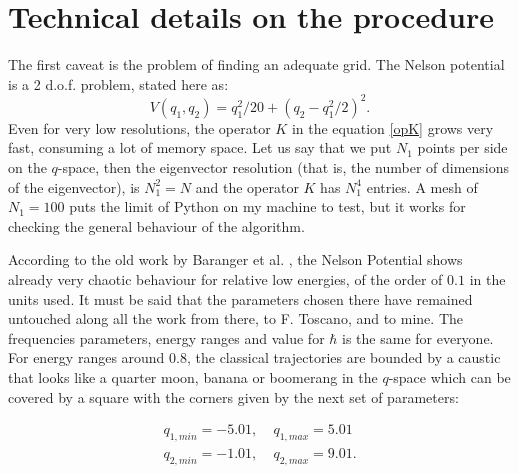 \documentclass[a4paper,12pt]{article}
\begin{document}
\section{Technical details on the procedure}

The first caveat is the problem of finding an adequate grid.
The Nelson potential is a 2 d.o.f. problem, stated here as:
\begin{equation}
V(q_1, q_2)=q_1^2/20+(q_2-q_1^2/2)^2.
\end{equation}
Even for 
very low resolutions, the operator $K$ in the equation \ref{opK}
grows very fast, consuming a lot of memory space. Let us say that
we put $N_1$ points per side on the $q$-space, then the eigenvector
resolution (that is, the number of dimensions of the eigenvector),
is $N_1^2=N$ and the operator $K$ has $N_1^4$ entries.
A mesh of $N_1=100$ puts the limit of Python on my machine to test,
but it works for checking the general behaviour of the algorithm. 

According to the old work by Baranger et al. \cite{Bar87, Bar93},
the Nelson Potential shows already very chaotic behaviour for relative low
energies, of the order of $0.1$ in the units used. It must be said
that the parameters chosen there have remained untouched along 
all the work from there, to F. Toscano, and to mine. The 
frequencies parameters, energy ranges and value for $\hbar$ is the same for
everyone. For energy ranges around $0.8$, the classical trajectories
are bounded by a caustic that looks like a quarter moon, banana or boomerang
in the $q$-space which can be covered by a square with the corners given 
by the next set of parameters:

\begin{align}
q_{1,min} =- 5.01, &\;  q_{1,max} = 5.01 \\
q_{2,min} =- 1.01, &\;  q_{2,max} = 9.01.
\end{align}
\end{document}
